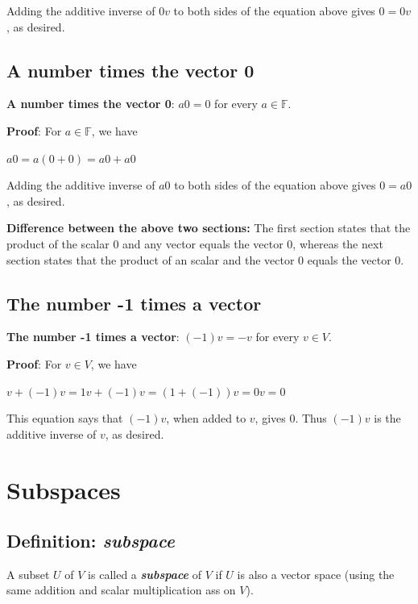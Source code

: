 \documentclass{report}
\begin{document}
\noindent Adding the additive inverse of $0v$ to both sides of the equation above gives $0=0v$, as desired.\newline

\subsection{A number times the vector 0}
\noindent \textbf{A number times the vector 0}: $a0=0$ for every $a \in \mathbb{F}$.\newline

\noindent \textbf{Proof}:\newline
\noindent For $a \in \mathbb{F}$, we have\newline
\centerline{$a0=a(0+0)=a0+a0$}\newline\newline
\noindent Adding the additive inverse of $a0$ to both sides of the equation above gives $0=a0$, as desired.

\noindent \textbf{Difference between the above two sections:}\newline
\noindent The first section states that the product of the scalar 0 and any vector equals the vector 0, whereas the next section states that the product of an scalar and the vector 0 equals the vector 0.\newline

\subsection{The number -1 times a vector}
\noindent \textbf{The number -1 times a vector}: $(-1)v=-v$ for every $v \in V$.\newline

\noindent \textbf{Proof}:\newline
\noindent For $v \in V$, we have\newline
\centerline{$v+(-1)v=1v+(-1)v=(1+(-1))v=0v=0$}\newline\newline
\noindent This equation says that $(-1)v$, when added to $v$, gives 0. Thus $(-1)v$ is the additive inverse of $v$, as desired.


\section{Subspaces}
\subsection{Definition: \textbf{\textit{subspace}}}
A subset $U$ of $V$ is called a \textbf{\textit{subspace}} of $V$ if $U$ is also a vector space (using the same addition and scalar multiplication ass on $V$).
\end{document}
